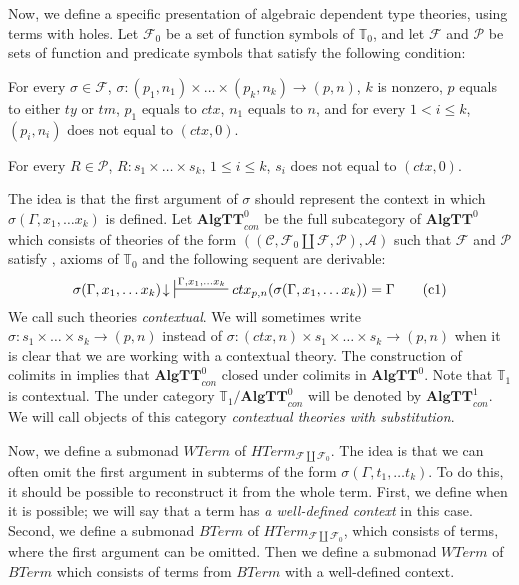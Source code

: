 \documentclass[reqno]{amsart}
\newcommand{\axtag}[1]{\label{ax:#1} \tag{#1}}
\theoremstyle{definition}
\theoremstyle{remark}
\newcommand{\cat}[1]{\mathbf{#1}}
\newcommand{\algtt}{\cat{AlgTT}}
\numberwithin{figure}{section}
\begin{document}
Now, we define a specific presentation of algebraic dependent type theories, using terms with holes.
Let $\mathcal{F}_0$ be a set of function symbols of $\mathbb{T}_0$, and let $\mathcal{F}$ and $\mathcal{P}$ be sets of function and predicate symbols that satisfy the following condition:
\begin{cond}[ctx]
For every $\sigma \in \mathcal{F}$, $\sigma : (p_1,n_1) \times \ldots \times (p_k,n_k) \to (p,n)$,
    $k$ is nonzero, $p$ equals to either $ty$ or $tm$, $p_1$ equals to $ctx$, $n_1$ equals to $n$, and for every $1 < i \leq k$, $(p_i,n_i)$ does not equal to $(ctx,0)$.

For every $R \in \mathcal{P}$, $R : s_1 \times \ldots \times s_k$, $1 \leq i \leq k$, $s_i$ does not equal to $(ctx,0)$.
\end{cond}
The idea is that the first argument of $\sigma$ should represent the context in which $\sigma(\Gamma, x_1, \ldots x_k)$ is defined.
Let $\algtt^0_{con}$ be the full subcategory of $\algtt^0$ which consists of theories of the form $((\mathcal{C}, \mathcal{F}_0 \amalg \mathcal{F}, \mathcal{P}), \mathcal{A})$
    such that $\mathcal{F}$ and $\mathcal{P}$ satisfy , axioms of $\mathbb{T}_0$ and the following sequent are derivable:
\begin{equation}
\sigma(\Gamma, x_1, \ldots x_k)\!\downarrow\ \sststile{}{\Gamma, x_1, \ldots x_k} ctx_{p,n}(\sigma(\Gamma, x_1, \ldots x_k)) = \Gamma \axtag{c1}
\end{equation}
We call such theories \emph{contextual}.
We will sometimes write $\sigma : s_1 \times \ldots \times s_k \to (p,n)$ instead of $\sigma : (ctx,n) \times s_1 \times \ldots \times s_k \to (p,n)$
    when it is clear that we are working with a contextual theory.
The construction of colimits in  implies that $\algtt^0_{con}$ closed under colimits in $\algtt^0$.
Note that $\mathbb{T}_1$ is contextual.
The under category $\mathbb{T}_1/\algtt^0_{con}$ will be denoted by $\algtt^1_{con}$.
We will call objects of this category \emph{contextual theories with substitution}.

Now, we define a submonad $WTerm$ of $HTerm_{\mathcal{F} \amalg \mathcal{F}_0}$.
The idea is that we can often omit the first argument in subterms of the form $\sigma(\Gamma, t_1, \ldots t_k)$.
To do this, it should be possible to reconstruct it from the whole term.
First, we define when it is possible; we will say that a term has \emph{a well-defined context} in this case.
Second, we define a submonad $BTerm$ of $HTerm_{\mathcal{F} \amalg \mathcal{F}_0}$, which consists of terms, where the first argument can be omitted.
Then we define a submonad $WTerm$ of $BTerm$ which consists of terms from $BTerm$ with a well-defined context.
\end{document}
